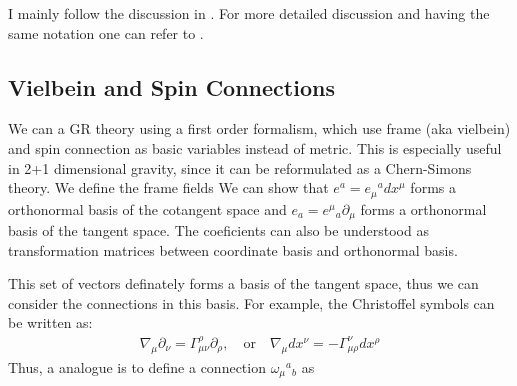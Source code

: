 
I mainly follow the discussion in \cite{Carlip:1998qg}. For more
detailed discussion and having the same notation one can refer to
\cite{carrollSpacetimeGeometryIntroduction2014}.

\subsection{Vielbein and Spin Connections}

We can a GR theory using a first order formalism, which use frame
(aka vielbein) and spin connection as basic variables instead of
metric. This is especially useful in 2+1 dimensional gravity, since
it can be reformulated as a Chern-Simons theory.
We define the frame fields
We can show that $ e^a = e_\mu{}^a d x^\mu $ forms a orthonormal
basis of the cotangent space and $ e_a =  {e^\mu}_a \partial_\mu $
forms a orthonormal basis of the tangent space. The coeficients can
also be understood as transformation matrices between coordinate
basis and orthonormal basis.

This set of vectors definately forms a basis of the tangent space,
thus we can consider the connections in this basis. For example, the
Christoffel symbols can be written as:
\begin{align}
  \nabla_\mu \partial_{\nu} = \Gamma_{\mu\nu}^\rho \partial_\rho,
  \quad \text{or}\quad \nabla_\mu dx^{\nu} = -\Gamma_{\mu\rho}^\nu dx^\rho
\end{align}
Thus, a analogue is to define a connection $ \omega_\mu{}^a{}_b $ as

